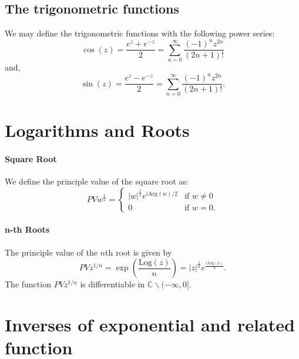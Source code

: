 \documentclass[12pt, letterpaper]{article}
\begin{document}
    \subsection{The trigonometric functions}
    We may define the trigonometric functions with the following power series:
    \[
        \cos(z) = \frac{e^z + e^{-z}}{2} = \sum_{n=0}^{\infty} 
        \frac{(-1)^n z^{2n}}{(2n+1)!}
    \]
    and,
    \[ 
        \sin(z) = \frac{e^z - e^{-z}}{2} = \sum_{n=0}^{\infty}
        \frac{(-1)^n z^{2n}}{(2n+1)!}.
    \]


    \section{Logarithms and Roots}
    \paragraph{Square Root}
    We define the principle value of the square root as:
    \[
        PV w^{\frac{1}{2}} = \begin{cases}
            |w|^\frac{1}{2} e^{i\mathrm{Arg}(w)/2} & \text{if \(w \neq 0\)} \\
            0   & \text{if \(w = 0\).}
        \end{cases}
    \]
    
    \paragraph{n-th Roots}
    The principle value of the \(n\)th root is given by 
    \[
        PV z^{1/n} = \exp\left(\frac{\mathrm{Log}(z)}{n}\right)
        = |z|^\frac{1}{n} e^{\frac{i\mathrm{Arg(z)}}{n}}.
    \]
    The function \(PVz^{1/n}\) is differentiable in
    \(\mathbb{C} \backslash (-\infty, 0].\)


    \section{Inverses of exponential and related function}
\end{document}
